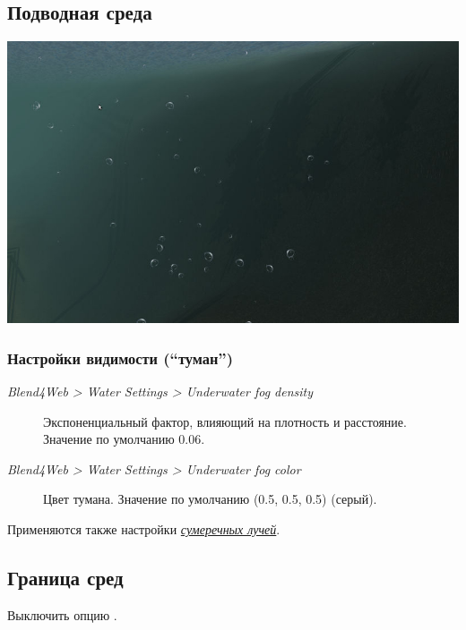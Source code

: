 \documentclass[a4paper,12pt,oneside]{sphinxmanual}
\begin{document}
\subsection{Подводная среда}
\label{outdoor_rendering:id17}
{\hfill\includegraphics[width=1.000\linewidth]{underwater.jpg}\hfill}


\subsubsection{Настройки видимости (``туман'')}
\label{outdoor_rendering:id18}\begin{description}
\item[{\emph{Blend4Web \textgreater{} Water Settings \textgreater{} Underwater fog density}}] \leavevmode
Экспоненциальный фактор, влияющий на плотность и расстояние. Значение по умолчанию 0.06.

\item[{\emph{Blend4Web \textgreater{} Water Settings \textgreater{} Underwater fog color}}] \leavevmode
Цвет тумана. Значение по умолчанию (0.5, 0.5, 0.5) (серый).

\end{description}

Применяются также настройки {\hyperref[postprocessing_effects:god-rays]{\emph{сумеречных лучей}}}.


\subsection{Граница сред}
\label{outdoor_rendering:id19}
Выключить опцию .
\end{document}
